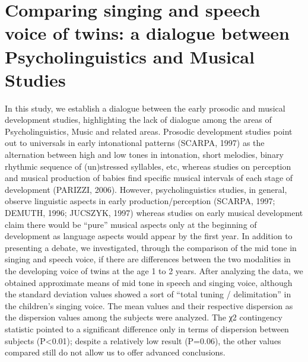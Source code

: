 \chapter{Comparing singing and speech voice of twins: a dialogue between Psycholinguistics and Musical Studies}\label{ch:mariadefátima7}
\begin{affils}
\end{affils}

In this study, we establish a dialogue between the early prosodic and musical development studies, highlighting the lack of dialogue among the areas of Psycholinguistics, Music and related areas. Prosodic development studies point out to universals in early intonational patterns (SCARPA, 1997) as the alternation between high and low tones in intonation, short melodies, binary rhythmic sequence of (un)stressed syllables, etc, whereas studies on perception and musical production of babies find specific musical intervals of each stage of development (PARIZZI, 2006). However, psycholinguistics studies, in general, observe linguistic aspects in early production/perception (SCARPA, 1997; DEMUTH, 1996; JUCSZYK, 1997) whereas studies on early musical development claim there would be “pure” musical aspects only at the beginning of development as language aspects would appear by the first year. In addition to presenting a debate, we investigated, through the comparison of the mid tone in singing and speech voice, if there are differences between the two modalities in the developing voice of twins at the age 1 to 2 years. After analyzing the data, we obtained approximate means of mid tone in speech and singing voice, although the standard deviation values showed a sort of “total tuning / delimitation” in the children's singing voice. The mean values and their respective dispersion as the dispersion values among the subjects were analyzed. The χ2 contingency statistic pointed to a significant difference only in terms of dispersion between subjects (P<0.01); despite a relatively low result (P=0.06), the other values compared still do not allow us to offer advanced conclusions.
